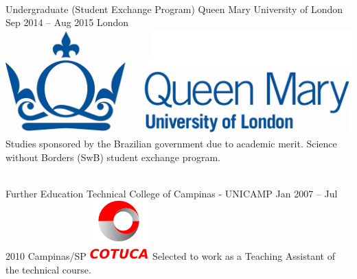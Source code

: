 \documentclass[
	a4paper,
]{fortysecondscv}
\newcommand{\profiledivider}{\textcolor{body!30}{\hdashrule{\linewidth}{0.6pt}{0.5ex}}\\}
\begin{document}
    \profiledivider
    \cvevent
        {Undergraduate (Student Exchange Program)}
        {Queen Mary University of London}
        {Sep 2014 -- Aug 2015}
        {London}
        {\hspace{2mm}\includegraphics[height=0.05\textwidth]{QMUL}}
        {Studies sponsored by the Brazilian government due to academic merit. Science without Borders (SwB) student exchange program.}

    \profiledivider
	\cvevent
        {Further Education}
        {Technical College of Campinas - UNICAMP}
        {Jan 2007 -- Jul 2010}
        {Campinas/SP}
        {\hspace{2mm}\includegraphics[height=0.07\textwidth]{Cotuca}}
        {Selected to work as a Teaching Assistant of the technical course.}
\end{document}
